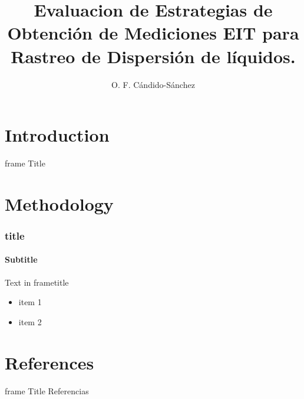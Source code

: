 \documentclass{beamer}
\title{Evaluacion de Estrategias de Obtención de Mediciones EIT para Rastreo de Dispersión de líquidos. }
\author{O. F. Cándido-Sánchez}
\begin{document}
  \maketitle

\section{Introduction}

\begin{frame}{frame Title}
\tableofcontents
\end{frame}

\section{Methodology}
\begin{frame}
  \frametitle{title}
  \framesubtitle{Subtitle}
  Text in frametitle
  \begin{itemize}
\item item 1
\item item 2
  \end{itemize}
\end{frame}

\section{References}

\begin{frame}{frame Title}
Referencias
\end{frame}
\end{document}
